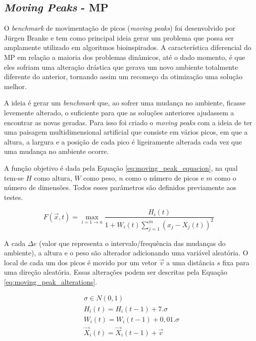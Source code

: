 \subsection{\textit{Moving Peaks} - MP}
\label{sec:moving_peaks}

O \textit{benchmark} de movimentação de picos (\textit{moving peaks}) foi desenvolvido por Jürgen Branke \cite{moving_peak_1999} e tem como principal ideia gerar um problema que possa ser amplamente utilizado em algoritmos bioinspirados. A característica diferencial do MP em relação a maioria dos problemas dinâmicos, até o dado momento, é que eles sofriam uma alteração drástica que gerava um novo ambiente totalmente diferente do anterior, tornando assim um recomeço da otimização uma solução melhor.

A ideia é gerar um \textit{benchmark} que, ao sofrer uma mudança no ambiente, ficasse levemente alterado, o suficiente para que as soluções anteriores ajudassem a encontrar as novas geradas. Para isso foi criado o \textit{moving peaks} com a ideia de ter uma paisagem multidimensional artificial que consiste em vários picos, em que a altura, a largura e a posição de cada pico é ligeiramente alterada cada vez que uma mudança no ambiente ocorre.

A função objetivo é dada pela Equação \ref{eq:moving_peak_equacion}, na qual tem-se $ H $ como altura, $ W $ como peso, $ n $ como o número de picos e $ m $ como o número de dimensões. Todos esses parâmetros são definidos previamente aos testes.

\begin{equation}
\label{eq:moving_peak_equacion}
F(\vec{x},t) = \max_{i = 1 \to n} \frac {H_i(t)}{1 + W_i(t)\sum_{j=1}^{m} (x_j - X_j(t))^2}
\end{equation}

A cada $\Delta e$ (valor que representa o intervalo/frequência das mudanças do ambiente), a altura e o peso são alterador adicionando uma variável aleatória. O local de cada um dos picos é movido por um vetor $\vec{v}$ a uma distância $ s $ fixa para uma direção aleatória. Essas alterações podem ser descritas pela Equação \ref{eq:moving_peak_alterations}.

\begin{equation}
\label{eq:moving_peak_alterations}
\begin{split}
& \sigma \in N(0,1) \\
& H_i(t) = H_i(t-1) + 7.\sigma \\
& W_i(t) = W_i(t-1) + 0,01.\sigma \\
& \vec{X}_i(t) = \vec{X}_i(t-1) + \vec{v}
\end{split}
\end{equation}


